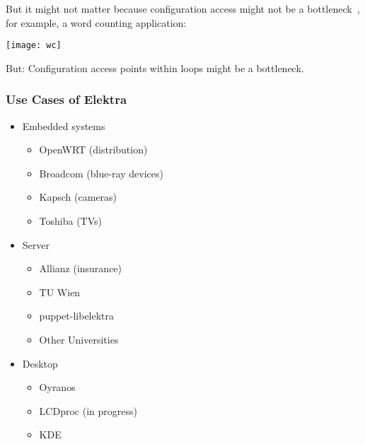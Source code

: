 \begin{frame}
	But it might not matter because configuration access might not be a bottleneck~\cite{raab2015kps},
	for example, a word counting application:

	\texttt{[image: wc]}

	But: \pause
	Configuration access points within loops might be a bottleneck.
\end{frame}

\begin{frame}
	\frametitle{Use Cases of Elektra}
	\begin{itemize}[<+->]
	\item Embedded systems
	\begin{itemize}
	\item OpenWRT (distribution)
	\item Broadcom (blue-ray devices)
	\item Kapsch (cameras)
	\item Toshiba (TVs)
	\end{itemize}
	\item Server
	\begin{itemize}
	\item Allianz (insurance)
	\item TU Wien
	\item puppet-libelektra
	\item Other Universities
	\end{itemize}
	\item Desktop
	\begin{itemize}
	\item Oyranos
	\item LCDproc (in progress)
	\item KDE
	\end{itemize}
	\end{itemize}
\end{frame}

